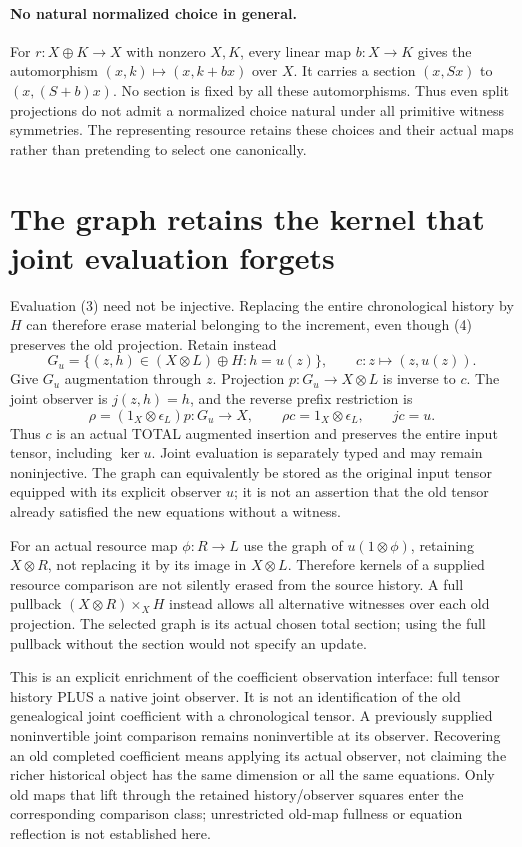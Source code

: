 \documentclass[11pt]{article}
\begin{document}
\paragraph{No natural normalized choice in general.}
For $r:X\oplus K\to X$ with nonzero $X,K$, every linear map $b:X\to K$ gives the automorphism $(x,k)\mapsto(x,k+bx)$ over $X$. It carries a section $(x,Sx)$ to $(x,(S+b)x)$. No section is fixed by all these automorphisms. Thus even split projections do not admit a normalized choice natural under all primitive witness symmetries. The representing resource retains these choices and their actual maps rather than pretending to select one canonically.

\section{The graph retains the kernel that joint evaluation forgets}
Evaluation (3) need not be injective. Replacing the entire chronological history by $H$ can therefore erase material belonging to the increment, even though (4) preserves the old projection. Retain instead
\[
 G_u=\{(z,h)\in(X\otimes L)\oplus H:h=u(z)\},\qquad
 c:z\mapsto(z,u(z)).\tag{6}
\]
Give $G_u$ augmentation through $z$. Projection $p:G_u\to X\otimes L$ is inverse to $c$. The joint observer is $j(z,h)=h$, and the reverse prefix restriction is
\[
 \rho=(1_X\otimes\epsilon_L)p:G_u\to X,
 \qquad \rho c=1_X\otimes\epsilon_L,
 \qquad jc=u.\tag{7}
\]
Thus $c$ is an actual TOTAL augmented insertion and preserves the entire input tensor, including $\ker u$. Joint evaluation is separately typed and may remain noninjective. The graph can equivalently be stored as the original input tensor equipped with its explicit observer $u$; it is not an assertion that the old tensor already satisfied the new equations without a witness.

For an actual resource map $\phi:R\to L$ use the graph of $u(1\otimes\phi)$, retaining $X\otimes R$, not replacing it by its image in $X\otimes L$. Therefore kernels of a supplied resource comparison are not silently erased from the source history. A full pullback $(X\otimes R)\times_X H$ instead allows all alternative witnesses over each old projection. The selected graph is its actual chosen total section; using the full pullback without the section would not specify an update.

This is an explicit enrichment of the coefficient observation interface: full tensor history PLUS a native joint observer. It is not an identification of the old genealogical joint coefficient with a chronological tensor. A previously supplied noninvertible joint comparison remains noninvertible at its observer. Recovering an old completed coefficient means applying its actual observer, not claiming the richer historical object has the same dimension or all the same equations. Only old maps that lift through the retained history/observer squares enter the corresponding comparison class; unrestricted old-map fullness or equation reflection is not established here.
\end{document}
